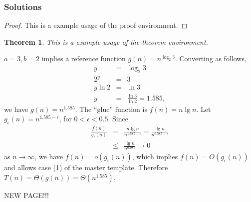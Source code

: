 \documentclass{article}%
\newtheorem{theorem}{Theorem}
\theoremstyle{definition}
\begin{document}
\subsubsection*{Solutions}
\begin{proof}
This is a example usage of the proof environment.
\end{proof}
\begin{theorem}
This is a example usage of the theorem environment.
\end{theorem}
$a = 3, b = 2$ implies a reference function $g(n) = n^{\log_2 3}$. Converting as follows,
\begin{eqnarray*}
y & = & \log_2 3 \\
2^y & = & 3 \\
y \ln 2 & = & \ln 3 \\
y & = & \frac{\ln 3}{\ln 2} = 1.585,
\end{eqnarray*}
we have $g(n) = n^{1.585}$.  The ``glue'' function is $f(n) = n \lg n$.  Let $g_\epsilon (n) = n^{1.585 - \epsilon}$, for 
$0 < \epsilon < 0.5$. Since
\begin{eqnarray*}
\frac{f(n)}{g_\epsilon (n)} & = & \frac{n \lg n}{n^{1.585 - \epsilon}} = \frac{\lg n}{n^{0.585 - \epsilon}} \\
 & \leq & \frac{\lg n}{n^{0.085}} \rightarrow 0
\end{eqnarray*}
as $n \rightarrow \infty$, we have $f(n) = o(g_\epsilon (n))$, which implies $f(n) = O(g_\epsilon (n))$ and allows case (1) of the 
master template.  Therefore $T(n) = \Theta(g(n)) = \Theta(n^{1.585})$.

\newpage
NEW PAGE!!!
\end{document}
